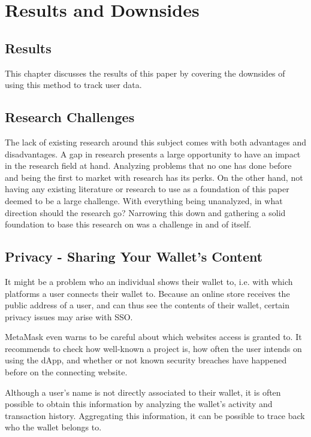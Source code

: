 \chapter{Results and Downsides}
\label{ch:results}


%
%
\section{Results}
\label{sec:results:results}
This chapter discusses the results of this paper by covering the downsides of using this method to track user data.


%
%
\section{Research Challenges}
\label{sec:results:researchChallenges}
The lack of existing research around this subject comes with both advantages and disadvantages. A gap in research presents a large opportunity to have an impact in the research field at hand. Analyzing problems that no one has done before and being the first to market with research has its perks. On the other hand, not having any existing literature or research to use as a foundation of this paper deemed to be a large challenge. With everything being unanalyzed, in what direction should the research go? Narrowing this down and gathering a solid foundation to base this research on was a challenge in and of itself.


\section{Privacy - Sharing Your Wallet's Content}
\label{sec:results:walletContent}
It might be a problem who an individual shows their wallet to, i.e. with which platforms a user connects their wallet to. Because an online store receives the public address of a user, and can thus see the contents of their wallet, certain privacy issues may arise with SSO.

MetaMask even warns to be careful about which websites access is granted to. It recommends to check how well-known a project is, how often the user intends on using the dApp, and whether or not known security breaches have happened before on the connecting website. \cite{metaMask}

Although a user's name is not directly associated to their wallet, it is often possible to obtain this information by analyzing the wallet's activity and transaction history. Aggregating this information, it can be possible to trace back who the wallet belongs to.

